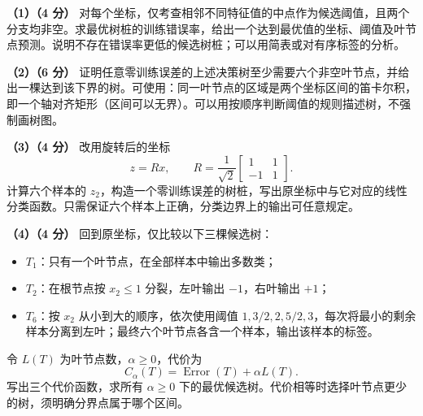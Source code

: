 \documentclass[11pt,a4paper]{article}
\newcommand{\partq}[2]{\par\Needspace{6\baselineskip}\noindent\textbf{（#1）（#2 分）}}
\begin{document}
\partq{1}{4} 对每个坐标，仅考查相邻不同特征值的中点作为候选阈值，且两个分支均非空。求最优树桩的训练错误率，给出一个达到最优值的坐标、阈值及叶节点预测。说明不存在错误率更低的候选树桩；可以用简表或对有序标签的分析。

\partq{2}{6} 证明任意零训练误差的上述决策树至少需要六个非空叶节点，并给出一棵达到该下界的树。可使用：同一叶节点的区域是两个坐标区间的笛卡尔积，即一个轴对齐矩形（区间可以无界）。可以用按顺序判断阈值的规则描述树，不强制画树图。

\partq{3}{4} 改用旋转后的坐标
\[
z=R x,\qquad
R=\frac1{\sqrt2}\begin{bmatrix}1&1\\-1&1\end{bmatrix}.
\]
计算六个样本的 $z_2$，构造一个零训练误差的树桩，写出原坐标中与它对应的线性分类函数。只需保证六个样本上正确，分类边界上的输出可任意规定。

\partq{4}{4} 回到原坐标，仅比较以下三棵候选树：
\begin{itemize}
\item $T_1$：只有一个叶节点，在全部样本中输出多数类；
\item $T_2$：在根节点按 $x_2\leq1$ 分裂，左叶输出 $-1$，右叶输出 $+1$；
\item $T_6$：按 $x_2$ 从小到大的顺序，依次使用阈值 $1,3/2,2,5/2,3$，每次将最小的剩余样本分离到左叶；最终六个叶节点各含一个样本，输出该样本的标签。
\end{itemize}
令 $L(T)$ 为叶节点数，$\alpha\geq0$，代价为
\[
C_\alpha(T)=\operatorname{Error}(T)+\alpha L(T).
\]
写出三个代价函数，求所有 $\alpha\geq0$ 下的最优候选树。代价相等时选择叶节点更少的树，须明确分界点属于哪个区间。
\end{document}
